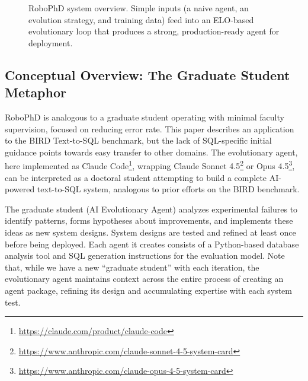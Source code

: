 \documentclass{article}
\begin{document}
\begin{figure}[ht]

    \caption{RoboPhD system overview. Simple inputs (a naive agent, an evolution strategy, and training data) feed into an ELO-based evolutionary loop that produces a strong, production-ready agent for deployment.}
    \label{fig:system-overview}
\end{figure}

\subsection{Conceptual Overview: The Graduate Student Metaphor}
\label{subsec:academic-metaphor}

RoboPhD is analogous to a graduate student operating with minimal faculty supervision, focused on reducing error rate.  This paper describes an application to the BIRD Text-to-SQL benchmark, but the lack of SQL-specific initial guidance points towards easy transfer to other domains.  The evolutionary agent, here implemented as Claude Code\footnote{\url{https://claude.com/product/claude-code}}, wrapping Claude Sonnet 4.5\footnote{\url{https://www.anthropic.com/claude-sonnet-4-5-system-card}} or Opus 4.5\footnote{\url{https://www.anthropic.com/claude-opus-4-5-system-card}}, can be interpreted as a doctoral student attempting to build a complete AI-powered text-to-SQL system, analogous to prior efforts on the BIRD benchmark.

The graduate student (AI Evolutionary Agent) analyzes experimental failures to identify patterns, forms hypotheses about improvements, and implements these ideas as new system designs.  System designs are tested and refined at least once before being deployed. Each agent it creates consists of a Python-based database analysis tool and SQL generation instructions for the evaluation model.  Note that, while we have a new ``graduate student'' with each iteration, the evolutionary agent maintains context across the entire process of creating an agent package, refining its design and accumulating expertise with each system test.
\end{document}
